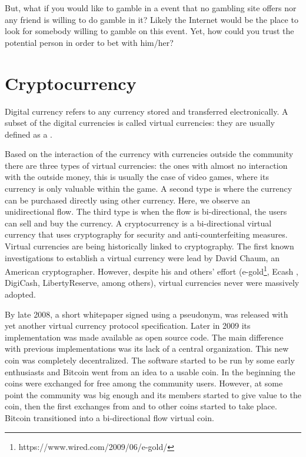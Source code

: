 But, what if you would like to gamble in a event that no gambling site offers
  nor any friend is willing to do gamble in it? Likely the Internet would be the
  place to look for somebody willing to gamble on this event. Yet, how could you
  trust the potential person in order to bet with him/her?

\section{Cryptocurrency}
Digital currency refers to any currency stored and transferred
  electronically.
A subset of the digital currencies is called virtual currencies: they are
  usually defined \cite{bcentraleuro} as a .

Based on the interaction of the currency with currencies outside the
  community there are three types of virtual currencies: the ones with almost
  no interaction with the outside money, this is usually the case of video
  games, where its currency is only valuable within the game. A second
  type is where the currency can be purchased directly using other currency.
  Here, we observe an unidirectional flow. The third type is when the flow is
  bi-directional, the users can sell and buy the currency.
A cryptocurrency is a bi-directional virtual currency that uses cryptography
  for security and anti-counterfeiting measures. Virtual currencies are being
  historically linked to cryptography. The first known investigations
  \cite{chaum1983blind} to establish a virtual currency were lead by David
  Chaum, an American cryptographer. However, despite his and others' effort
  (e-gold\footnote{https://www.wired.com/2009/06/e-gold/},
  Ecash \cite{chaum1990untraceable},
  DigiCash, LibertyReserve, among others), virtual currencies never were
  massively adopted.

By late 2008, a short whitepaper \cite{nakamoto2008bitcoin} signed using a
  pseudonym, was released with yet another virtual currency protocol
  specification. Later in 2009 its implementation was made available as open
  source code. The main difference with previous implementations was its lack of
  a central organization. This new coin was completely decentralized.
The software started to be run by some early enthusiasts and Bitcoin went from
  an idea to a usable coin.
In the beginning the coins were exchanged for free among the community users.
However, at some point the community was big enough and its members started
  to give value to the coin, then the first exchanges from and to other coins
  started to take place. Bitcoin transitioned into a bi-directional flow
  virtual coin.

